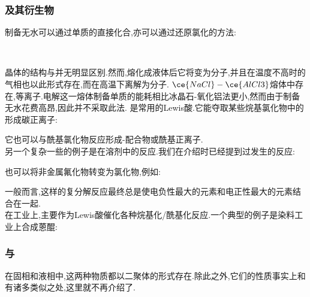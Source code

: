 \documentclass{ctexart}
\begin{document}
\subsubsection{及其衍生物}
制备无水可以通过单质的直接化合,亦可以通过还原氯化的方法:
\begin{center}
    \\
\end{center}

\indent {}晶体的结构与并无明显区别.然而,熔化成液体后它将变为分子,并且在温度不高时的气相也以此形式存在,而在高温下离解为分子.
$\ce{NaCl}-\ce{AlCl3}$熔体中存在\ce{[AlCl4]-},\ce{[Al2Cl7]-}等离子.电解这一熔体制备单质的能耗相比冰晶石-氧化铝法更小,然而由于制备无水花费高昂,因此并不采取此法.
是常用的Lewis酸.它能夺取某些烷基氯化物中的形成碳正离子:
\begin{center}
\end{center}
它也可以与酰基氯化物反应形成-配合物或酰基正离子\ce{[RCO]+[AlCl4]-}.\\
\indent 另一个复杂一些的例子是在溶剂中的反应.我们在介绍时已经提到过发生的反应:
\begin{center}
\end{center}

\indent {}也可以将非金属氟化物转变为氯化物,例如:
\begin{center}
\end{center}
一般而言,这样的复分解反应最终总是使电负性最大的元素和电正性最大的元素结合在一起.\\
\indent 在工业上,主要作为Lewis酸催化各种烷基化/酰基化反应.一个典型的例子是染料工业上合成蒽醌:
\begin{center}
\end{center}
\subsubsection{与}
在固相和液相中,这两种物质都以二聚体的形式存在.除此之外,它们的性质事实上和有诸多类似之处,这里就不再介绍了.
\end{document}
